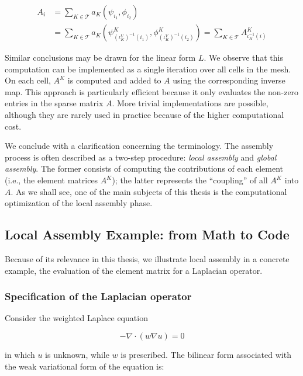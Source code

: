 \begin{equation}
\begin{split}
A_i & = \sum_{K \in \mathcal{T}} a_K (\psi_{i_1},\phi_{i_2}) \\
& = \sum_{K \in \mathcal{T}} a_K(\psi_{(\iota_K^U)^{-1}(i_1)}^K, \phi_{(\iota_K^V)^{-1}(i_2)}^K) = \sum_{K \in \mathcal{T}} A_{\iota_K^{-1}(i)}^K
\end{split}
\end{equation} 

Similar conclusions may be drawn for the linear form $L$. We observe that this computation can be implemented as a single iteration over all cells in the mesh. On each cell, $A^K$ is computed and added to $A$ using the corresponding inverse map. This approach is particularly efficient because it only evaluates the non-zero entries in the sparse matrix $A$. More trivial implementations are possible, although they are rarely used in practice because of the higher computational cost.

We conclude with a clarification concerning the terminology. The assembly process is often described as a two-step procedure: {\em local assembly}  and {\em global assembly}. The former consists of computing the contributions of each element (i.e., the element matrices $A^K$); the latter represents the ``coupling'' of all $A^K$ into $A$. As we shall see, one of the main subjects of this thesis is the computational optimization of the local assembly phase.

\subsection{Local Assembly Example: from Math to Code}
\label{sec:bkg:math-to-code}
Because of its relevance in this thesis, we illustrate local assembly in a concrete example, the evaluation of the element matrix for a Laplacian operator. 

\subsubsection{Specification of the Laplacian operator}
Consider the weighted Laplace equation

\begin{equation}
- \nabla \cdot (w \nabla u) = 0
\end{equation}

in which $u$ is unknown, while $w$ is prescribed. The bilinear form associated with the weak variational form of the equation is:

